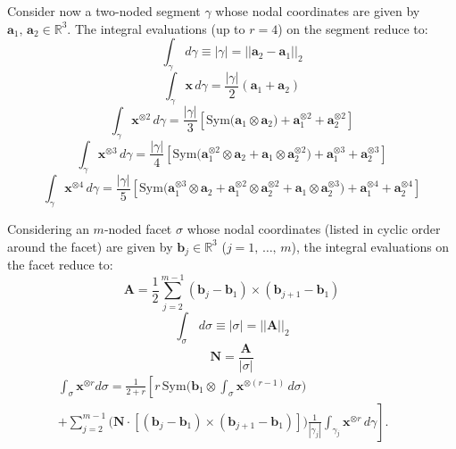 \documentclass[11pt]{article} %
\begin{document}
Consider now a two-noded segment $\gamma$ whose nodal coordinates are given by $\mathbf{a}_1, \, \mathbf{a}_2 \in \mathbb{R}^3$. The integral evaluations (up to $r = 4$) on the segment reduce to:
\begin{equation}
	\int_{\gamma} \, d \gamma \equiv | \gamma | = || \mathbf{a}_{2} - \mathbf{a}_{1} ||_2
\end{equation}
\begin{equation}
	\int_{\gamma} \mathbf{x} \, d \gamma = \frac{| \gamma |}{2} (\mathbf{a}_{1} + \mathbf{a}_{2})
\end{equation}
\begin{equation}
	\int_{\gamma} \mathbf{x}^{\otimes 2} \, d \gamma = \frac{| \gamma |}{3} \left[ \mbox{Sym} \bigg( \mathbf{a}_1 \otimes \mathbf{a}_{2} \bigg) + \mathbf{a}_1^{\otimes 2} + \mathbf{a}_2^{\otimes 2} \right]
\end{equation}
\begin{equation}
	\int_{\gamma} \mathbf{x}^{\otimes 3} \, d \gamma = \frac{| \gamma |}{4} \left[ \mbox{Sym} \bigg( \mathbf{a}_1^{\otimes 2} \otimes \mathbf{a}_{2} + \mathbf{a}_1 \otimes \mathbf{a}_2^{\otimes 2} \bigg) + \mathbf{a}_1^{\otimes 3} + \mathbf{a}_2^{\otimes 3} \right]
\end{equation}
\begin{equation}
	\int_{\gamma} \mathbf{x}^{\otimes 4} \, d \gamma = \frac{| \gamma |}{5} \left[ \mbox{Sym} \bigg( \mathbf{a}_1^{\otimes 3} \otimes \mathbf{a}_{2} + \mathbf{a}_1^{\otimes 2} \otimes \mathbf{a}_2^{\otimes 2} + \mathbf{a}_1 \otimes \mathbf{a}_2^{\otimes 3} \bigg) + \mathbf{a}_1^{\otimes 4} + \mathbf{a}_2^{\otimes 4} \right]
\end{equation}

Considering an $m$-noded facet $\sigma$ whose nodal coordinates (listed in cyclic order around the facet) are given by $\mathbf{b}_j \in \mathbb{R}^3$ ($j = 1, \, \ldots, \, m$), the integral evaluations on the facet reduce to:
\begin{equation}
	\mathbf{A} = \frac{1}{2} \sum_{j = 2}^{m-1} (\mathbf{b}_{j} - \mathbf{b}_1) \times (\mathbf{b}_{j+1} - \mathbf{b}_{1})
\end{equation}
\begin{equation}
	\int_{\sigma} \, d \sigma \equiv | \sigma | = || \mathbf{A} ||_2
\end{equation}
\begin{equation}
	\mathbf{N} = \frac{\mathbf{A}}{| \sigma |}
\end{equation}
\begin{eqnarray}
	\int_{\sigma} \mathbf{x}^{\otimes r} d \sigma = \frac{1}{2+r} \left[ r \, \mbox{Sym} \bigg( \mathbf{b}_1 \otimes \int_{\sigma} \mathbf{x}^{\otimes (r-1)} \, d \sigma \bigg) \qquad \qquad \qquad \qquad \right. \nonumber \\ + \left. \sum_{j = 2}^{m-1} \bigg( \mathbf{N} \cdot \left[ (\mathbf{b}_{j} - \mathbf{b}_1) \times (\mathbf{b}_{j+1} - \mathbf{b}_{1}) \right] \bigg) \frac{1}{| \gamma_j |}\int_{\gamma_j} \mathbf{x}^{\otimes r} \, d \gamma \right] .
\end{eqnarray}
\end{document}
